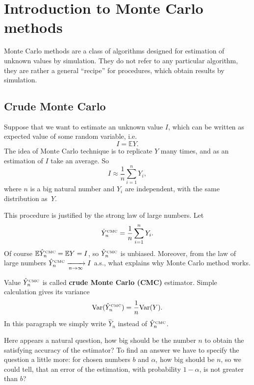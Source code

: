 \documentclass[a4paper,11pt, twoside]{book}
\theoremstyle{definition}
\theoremstyle{remark}
\def\Var{{\rm Var}}
\def\E{{\mathbb{E}}}
\def\conv{\xrightarrow[n \rightarrow \infty]{}}
\def\CMC[#1]{\hat{Y}^{\hbox{\tiny CMC}}_{#1}}
\begin{document}
\section{Introduction to Monte Carlo methods}
\label{sec:introMC}
Monte Carlo methods are a class of algorithms designed for estimation of unknown values by simulation.
They do not refer to any particular algorithm, they are rather a general ``recipe'' for procedures, which obtain results by simulation.

\subsection{Crude Monte Carlo}
Suppose that we want to estimate an unknown value $I$, which can be written as expected value of some random variable, i.e.
\begin{equation}
 \label{eq:EY}
 I = \E Y. 
\end{equation}
The idea of Monte Carlo technique is to replicate $Y$ many times, and as an estimation of $I$ take an average. So
\[ I \approx \frac{1}{n} \sum\limits_{i=1}^n Y_i, \]
where $n$ is a big natural number and $Y_i$ are independent, with the same distribution as~$Y$.

This procedure is justified by the strong law of large numbers. Let 
\begin{equation}
 \label{eq:CMC}
 \CMC[n] = \frac{1}{n}\sum\limits_{i=1}^n Y_i.
\end{equation}
Of course $\E\CMC[n] = \E Y = I$, so $\CMC[n]$ is unbiased. Moreover, from the law of large numbers $\CMC[n] \conv I$ a.s., what explains why Monte Carlo method works. 

Value $\CMC[n]$ is called \textbf{crude Monte Carlo (CMC)} estimator. Simple calculation gives its variance
\begin{equation}
 \label{eq:VarCMC}
 \Var(\CMC[n]) = \frac{1}{n}\Var(Y).
\end{equation}
In this paragraph we simply write $\hat{Y}_n$ instead of $\CMC[n]$.

Here appears a natural question, how big should be the number $n$ to obtain the satisfying accuracy of the estimator?
To find an answer we have to specify the question a little more: for chosen numbers $b$ and $\alpha$, how big should be $n$, so we could tell, that an error of the estimation, with probability $1-\alpha$, is not greater than $b$?
\end{document}
